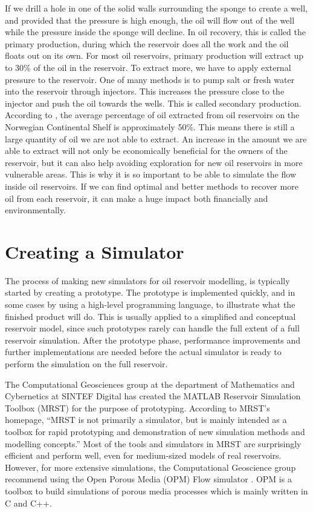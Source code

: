 If we drill a hole in one of the solid walls surrounding the sponge to create a well, and provided that the pressure is high enough, the oil will flow out of the well while the pressure inside the sponge will decline. In oil recovery, this is called the primary production, during which the reservoir does all the work and the oil floats out on its own. For most oil reservoirs, primary production will extract up to 30\% of the oil in the reservoir. To extract more, we have to apply external pressure to the reservoir. One of many methods is to pump salt or fresh water into the reservoir through injectors. This increases the pressure close to the injector and push the oil towards the wells. This is called secondary production. According to \citep{lieMrstUrl}, the average percentage of oil extracted from oil reservoirs on the Norwegian Continental Shelf is approximately 50\%. This means there is still a large quantity of oil we are not able to extract. An increase in the amount we are able to extract will not only be economically beneficial for the owners of the reservoir, but it can also help avoiding exploration for new oil reservoirs in more vulnerable areas. This is why it is so important to be able to simulate the flow inside oil reservoirs. If we can find optimal and better methods to recover more oil from each reservoir, it can make a huge impact both financially and environmentally.

\section{Creating a Simulator}
The process of making new simulators for oil reservoir modelling, is typically started by creating a prototype. The prototype is implemented quickly, and in some cases by using a high-level programming language, to illustrate what the finished product will do. This is usually applied to a simplified and conceptual reservoir model, since such prototypes rarely can handle the full extent of a full reservoir simulation. After the prototype phase, performance improvements and further implementations are needed before the actual simulator is ready to perform the simulation on the full reservoir. 

The Computational Geosciences group at the department of Mathematics and Cybernetics at SINTEF Digital has created the MATLAB Reservoir Simulation Toolbox (MRST) \emph{\citep{mrstHomepage}} for the  purpose of prototyping. According to MRST's homepage, \enquote{MRST is not primarily a simulator, but is mainly intended as a toolbox for rapid prototyping and demonstration of new simulation methods and modelling concepts.} Most of the tools and simulators in MRST are surprisingly efficient and perform well, even for medium-sized models of real reservoirs. However, for more extensive simulations, the Computational Geoscience group recommend using the Open Porous Media (OPM) Flow simulator \emph{\citep{opm}}. OPM is a toolbox to build simulations of porous media processes which is mainly written in C and C++. 

